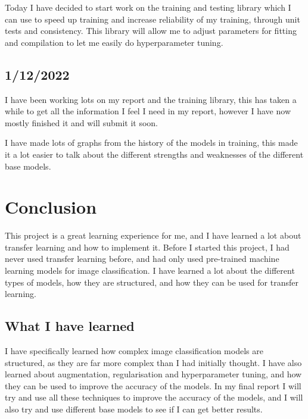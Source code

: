 \documentclass[]{final_report}
\begin{document}
Today I have decided to start work on the training and testing library which I can use to speed up training and increase reliability of my training, through unit tests and consistency.
This library will allow me to adjust parameters for fitting and compilation to let me easily do hyperparameter tuning.

\section*{1/12/2022}

I have been working lots on my report and the training library, this has taken a while to get all the information I feel I need in my report, however I have now mostly finished it and will submit it soon.

I have made lots of graphs from the history of the models in training, this made it a lot easier to talk about the different strengths and weaknesses of the different base models.

\chapter{Conclusion}

This project is a great learning experience for me, and I have learned a lot about transfer learning and how to implement it.
Before I started this project, I had never used transfer learning before, and had only used pre-trained machine learning models for image classification.
I have learned a lot about the different types of models, how they are structured, and how they can be used for transfer learning.


\section{What I have learned}
I have specifically learned how complex image classification models are structured, as they are far more complex than I had initially thought.
I have also learned about augmentation, regularisation and hyperparameter tuning, and how they can be used to improve the accuracy of the models.
In my final report I will try and use all these techniques to improve the accuracy of the models, and I will also try and use different base models to see if I can get better results.
\end{document}
